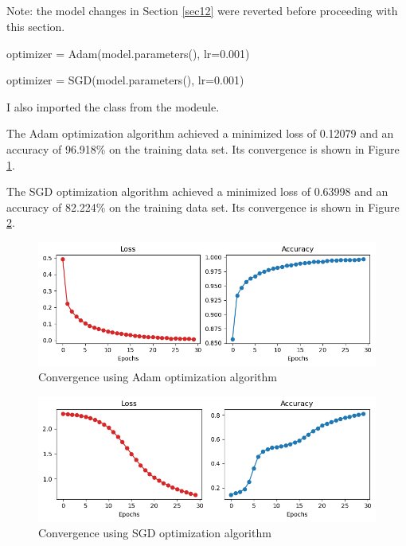 \documentclass[11pt]{article}
\begin{document}
\subsection{}  %

Note: the model changes in Section \ref{sec12} were reverted before proceeding
with this section.

\begin{python}[caption={Original Code},label={13code1}]
optimizer = Adam(model.parameters(), lr=0.001)
\end{python}

\begin{python}[caption={Modified Code},label={13code2}]
optimizer = SGD(model.parameters(), lr=0.001)
\end{python}
I also imported the  class from the 
modeule.

The Adam optimization algorithm achieved a minimized loss of 0.12079 and an
accuracy of 96.918\% on the training data set. Its convergence is shown in
Figure \ref{13fig1}.

The SGD optimization algorithm achieved a minimized loss of 0.63998 and an
accuracy of 82.224\% on the training data set. Its convergence is shown in
Figure \ref{13fig2}.

\begin{figure}[H]
    \centering
    \includegraphics[width=5.5in]{13fig1.png}
    \caption{Convergence using Adam optimization algorithm}
    \label{13fig1}
\end{figure}
\begin{figure}[H]
    \centering
    \includegraphics[width=5.5in]{13fig2.png}
    \caption{Convergence using SGD optimization algorithm}
    \label{13fig2}
\end{figure}
\end{document}
